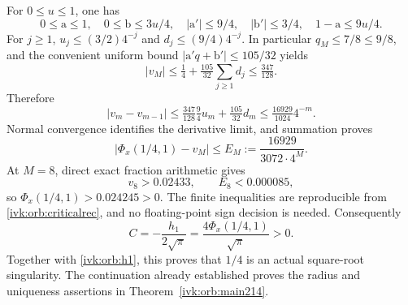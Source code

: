\documentclass[11pt,letterpaper]{article}
\theoremstyle{remark}\newtheorem{remark}[theorem]{Remark}
\begin{document}
For $0\le u\le1$, one has
\[
0\le\mathrm a\le1,\quad 0\le\mathrm b\le3u/4,\quad
|\mathrm a'|\le9/4,\quad|\mathrm b'|\le3/4,\quad
1-\mathrm a\le9u/4.
\]
For $j\ge1$, $u_j\le(3/2)4^{-j}$ and $d_j\le(9/4)4^{-j}$.
In particular $q_M\le7/8\le9/8$, and the convenient uniform bound
$|\mathrm a'q+\mathrm b'|\le105/32$ yields
\[
|v_M|\le\tfrac14+\tfrac{105}{32}\sum_{j\ge1}d_j
\le\tfrac{347}{128}.
\]
Therefore
\[
|v_m-v_{m-1}|\le\tfrac{347}{128}\tfrac94 u_m
+\tfrac{105}{32}d_m\le\tfrac{16929}{1024}4^{-m}.
\]
Normal convergence identifies the derivative limit, and summation proves
\begin{equation}\label{ivk:orb:derivtail}
\left|\Phi_x(1/4,1)-v_M\right|
\le E_M:=\frac{16929}{3072\cdot4^M}.
\end{equation}
At $M=8$, direct exact fraction arithmetic gives
\[
v_8>0.02433,\qquad E_8<0.000085,
\]
so $\Phi_x(1/4,1)>0.024245>0$. The finite inequalities are reproducible
from \eqref{ivk:orb:criticalrec}, and no floating-point sign decision is needed.
Consequently
\begin{equation}\label{ivk:orb:amplitude}
C=-\frac{h_1}{2\sqrt\pi}
=\frac{4\Phi_x(1/4,1)}{\sqrt\pi}>0.
\end{equation}
Together with \eqref{ivk:orb:h1}, this proves that $1/4$ is an actual square-root
singularity. The continuation already established proves the radius and
uniqueness assertions in Theorem~\ref{ivk:orb:main214}.
\end{document}
